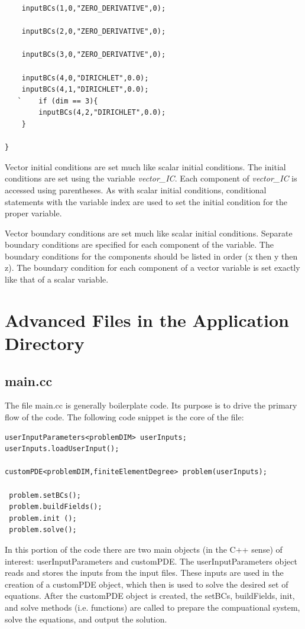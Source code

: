 \documentclass[10pt]{article} %
\begin{document}
\begin{lstlisting}
	inputBCs(1,0,"ZERO_DERIVATIVE",0);

	inputBCs(2,0,"ZERO_DERIVATIVE",0);

	inputBCs(3,0,"ZERO_DERIVATIVE",0);

	inputBCs(4,0,"DIRICHLET",0.0);
	inputBCs(4,1,"DIRICHLET",0.0);
   `	if (dim == 3){
		inputBCs(4,2,"DIRICHLET",0.0);
	}

}
\end{lstlisting} \normalsize

Vector initial conditions are set much like scalar initial conditions. The initial conditions are set using the variable \emph{vector\_IC}. Each component of \emph{vector\_IC} is accessed using parentheses. As with scalar initial conditions, conditional statements with the variable index are used to set the initial condition for the proper variable.

Vector boundary conditions are set much like scalar initial conditions. Separate boundary conditions are specified for each component of the variable. The boundary conditions for the components should be listed in order (x then y then z). The boundary condition for each component of a vector variable is set exactly like that of a scalar variable.

\section{Advanced Files in the Application Directory} \label{adv_input_sec}
\subsection{main.cc}
The file main.cc is generally boilerplate code. Its purpose is to drive the primary flow of the code. The following code snippet is the core of the file:
\tiny
\begin{lstlisting} 
userInputParameters<problemDIM> userInputs;
userInputs.loadUserInput();

customPDE<problemDIM,finiteElementDegree> problem(userInputs);

 problem.setBCs();
 problem.buildFields();
 problem.init ();
 problem.solve();
 \end{lstlisting}
 \normalsize
 
 In this portion of the code there are two main objects (in the C++ sense) of interest: userInputParameters and customPDE. The  userInputParameters object reads and stores the inputs from the input files. These inputs are used in the creation of a customPDE object, which then is used to solve the desired set of equations. After the customPDE object is created, the setBCs, buildFields, init, and solve methods (i.e. functions) are called to prepare the compuational system, solve the equations, and output the solution.
 
\end{document}
